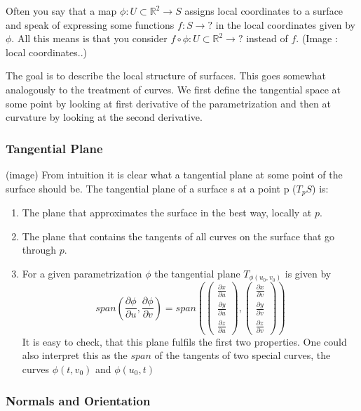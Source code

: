 Often you say that a map $\phi: U \subset \mathbb R^2 \rightarrow S$ assigns local coordinates to a surface and speak of expressing some functions $f:S \rightarrow ?$ in the local coordinates given by $\phi$. All this means is that you consider $f \circ \phi : U \subset \mathbb R^2 \rightarrow ?$ instead of $f$. (Image : local coordinates..) 


The goal is to describe the local structure of surfaces. This goes somewhat analogously to the treatment of curves. We first define the tangential space at some point by looking at first derivative of the parametrization and then at curvature by looking at the second derivative.

\subsubsection{Tangential Plane}

(image)
From intuition it is clear what a tangential plane at some point of the surface should be. The tangential plane of a surface s at a point p ($T_p S$) is:

\begin{enumerate}
	\item The plane that approximates the surface in the best way, locally at $p$.
	\item The plane that contains the tangents of all curves on the surface that go through $p$.
	\item For a given parametrization $\phi$ the tangential plane $T_{\phi(u_0,v_0)}$ is given by
			\[span(\frac{\partial \phi} {\partial u}, \frac{\partial \phi} {\partial v}) = span(\begin{pmatrix}
	\frac{\partial x} {\partial u} \\
	\frac{\partial y} {\partial u}\\
	\frac{\partial z} {\partial u}
\end{pmatrix},\begin{pmatrix}
	\frac{\partial x} {\partial v} \\
	\frac{\partial y} {\partial v}\\
	\frac{\partial z} {\partial v}
\end{pmatrix})\]
	It is easy to check, that this plane fulfils the first two properties. One could also interpret this as the $span$ of the tangents of two special curves, the curves $\phi(t, v_0)$ and $\phi(u_0, t)$
\end{enumerate}

\subsubsection{Normals and Orientation}

